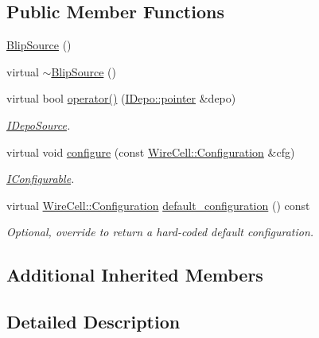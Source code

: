 \subsection*{Public Member Functions}
\begin{DoxyCompactItemize}
\item 
\hyperlink{class_wire_cell_1_1_gen_1_1_blip_source_a32c543287df31be2c76aad92e99c5530}{Blip\+Source} ()
\item 
virtual \hyperlink{class_wire_cell_1_1_gen_1_1_blip_source_ae8046b102b2253ea3dd56c9f7a1c153f}{$\sim$\+Blip\+Source} ()
\item 
virtual bool \hyperlink{class_wire_cell_1_1_gen_1_1_blip_source_a04f9ea72bc88d9e81a8254d6dd928b3a}{operator()} (\hyperlink{class_wire_cell_1_1_i_data_aff870b3ae8333cf9265941eef62498bc}{I\+Depo\+::pointer} \&depo)
\begin{DoxyCompactList}\small\item\em \hyperlink{class_wire_cell_1_1_i_depo_source}{I\+Depo\+Source}. \end{DoxyCompactList}\item 
virtual void \hyperlink{class_wire_cell_1_1_gen_1_1_blip_source_abad5738c05a277a841b31f819f1ce1e5}{configure} (const \hyperlink{namespace_wire_cell_a9f705541fc1d46c608b3d32c182333ee}{Wire\+Cell\+::\+Configuration} \&cfg)
\begin{DoxyCompactList}\small\item\em \hyperlink{class_wire_cell_1_1_i_configurable}{I\+Configurable}. \end{DoxyCompactList}\item 
virtual \hyperlink{namespace_wire_cell_a9f705541fc1d46c608b3d32c182333ee}{Wire\+Cell\+::\+Configuration} \hyperlink{class_wire_cell_1_1_gen_1_1_blip_source_a742f52a1859a3fac4c92fa2d8753d73f}{default\+\_\+configuration} () const
\begin{DoxyCompactList}\small\item\em Optional, override to return a hard-\/coded default configuration. \end{DoxyCompactList}\end{DoxyCompactItemize}
\subsection*{Additional Inherited Members}


\subsection{Detailed Description}


